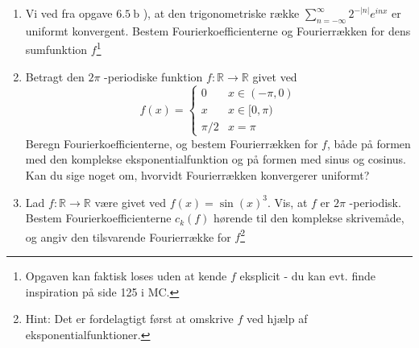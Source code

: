 \begin{itemize}
\begin{opg}[Fourierrækker I]
\begin{enumerate}
 \item Vi ved fra opgave $6.5 \mathrm{~b}$ ), at den trigonometriske række $\sum_{n=-\infty}^{\infty} 2^{-|n|} e^{i n x}$ er uniformt konvergent. Bestem Fourierkoefficienterne og Fourierrækken for dens sumfunktion $f$\footnote{Opgaven kan faktisk loses uden at kende $f$ eksplicit - du kan evt. finde inspiration på side 125 i MC.}
 \item Betragt den $2 \pi$ -periodiske funktion $f: \mathbb{R} \rightarrow \mathbb{R}$ givet ved
 $$
 f(x)=\left\{\begin{array}{ll}
 0 & x \in(-\pi, 0) \\
 x & x \in[0, \pi) \\
 \pi / 2 & x=\pi
 \end{array}\right.
 $$
 Beregn Fourierkoefficienterne, og bestem Fourierrækken for $f$, både på formen med den komplekse eksponentialfunktion og på formen med sinus og cosinus.
 Kan du sige noget om, hvorvidt Fourierrækken konvergerer uniformt?
 \item Lad $f: \mathbb{R} \rightarrow \mathbb{R}$ være givet ved $f(x)=\sin (x)^{3}$. Vis, at $f$ er $2 \pi$ -periodisk. Bestem Fourierkoefficienterne $c_{k}(f)$ hørende til den komplekse skrivemåde, og angiv den tilsvarende Fourierrække for $f$\footnote{Hint: Det er fordelagtigt først at omskrive $f$ ved hjælp af eksponentialfunktioner.}
\end{enumerate}
    \end{opg}
    

\end{itemize}
